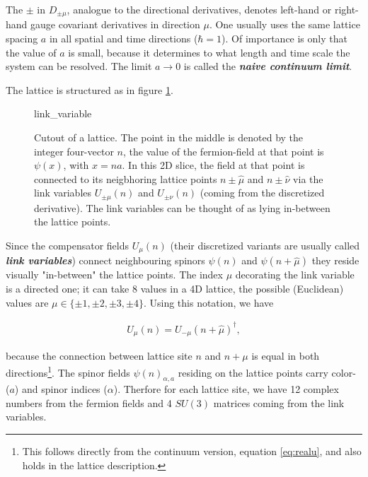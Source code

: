 \documentclass{article}
\theoremstyle{plain} %
\theoremstyle{convention} %
\theoremstyle{remark} %
\def\df#1{\textbf{\textit{#1}}}
\numberwithin{equation}{section}
\begin{document}
The $\pm$ in $D_{\pm \mu}$, analogue to the directional derivatives, denotes left-hand or right-hand gauge covariant derivatives in direction $\mu$. One usually uses the same lattice spacing $a$ in all spatial and time directions ($\hbar = 1$). Of importance is only that the value of $a$ is small, because it determines to what length and time scale the system can be resolved. The limit $a \to 0$ is called the \df {naive continuum limit}.

The lattice is structured as in figure \ref{fig:link_variable}.

\begin{figure}[H]
  \centering
  {link_variable}
  \caption{Cutout of a lattice. The point in the middle is denoted by the integer four-vector \textcolor{cblue}{$n$}, the value of the fermion-field at that point is $\psi(x)$, with $x=na$. In this 2D slice, the field at that point is connected to its neigbhoring lattice points \textcolor{cblue}{$n \pm \hat{\mu}$} and \textcolor{cblue}{$n \pm \hat{\nu}$} via the link variables \textcolor{cred}{$U_{\pm\mu}(n)$} and \textcolor{cgreen}{$U_{\pm\nu}(n)$} (coming from the discretized derivative). The link variables can be thought of as lying in-between the lattice points.}
  \label{fig:link_variable}
\end{figure}

Since the compensator fields $U_{\mu}(n)$ (their discretized variants are usually called \df{link variables}) connect neighbouring spinors $\psi(n)$ and $\psi(n + \hat{\mu})$ they reside visually "in-between" the lattice points. The index $\mu$ decorating the link variable is a directed one; it can take 8 values in a 4D lattice, the possible (Euclidean) values are $\mu \in \{\pm 1, \pm 2, \pm 3, \pm 4\}$. Using this notation, we have

\begin{align}
    U_{\mu}(n) = U_{-\mu}(n + \hat{\mu})^{\dagger}, \label{eq:U_relation}
\end{align}

because the connection between lattice site $n$ and $n + \mu$ is equal in both directions\footnote{This follows directly from the continuum version, equation \eqref{eq:realu}, and also holds in the lattice description.}. The spinor fields $\psi(n)_{\alpha,a}$ residing on the lattice points carry color- ($a$) and spinor indices ($\alpha$). Therfore for each lattice site, we have \num{12} complex numbers from the fermion fields and \num{4} $SU(3)$ matrices coming from the link variables.
\end{document}
